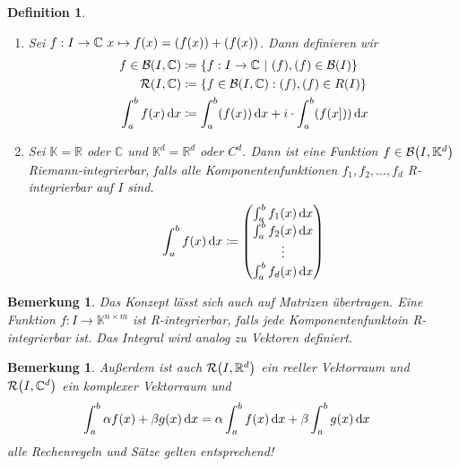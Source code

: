 \documentclass[11pt, twoside, a4paper]{article}
\theoremstyle{plain}
\newtheorem{bemerkung}[blockelement]{Bemerkung}
\newtheorem{definition}[blockelement]{Definition}
\numberwithin{equation}{subsection}
\newcommand{\set}[1]{\left\{#1\right\}}
\newcommand{\of}[1]{\mathopen{}\mathclose{}\bgroup\left(#1\aftergroup\egroup\right)}
\newcommand{\fromto}{\rightarrow{}}
\newcommand{\dif}{\mathop{}\!\mathrm{d}}
\newcommand{\theoremescape}{\leavevmode}
\let\Re\relax
\let\Im\relax
\DeclareMathOperator{\Re}{Re}
\DeclareMathOperator{\Im}{Im}
\newcommand{\R}{\mathbb{R}}
\newcommand{\C}{\mathbb{C}}
\newcommand{\K}{\mathbb{K}}
\newcommand{\mR}{\mathcal{R}}
\newcommand{\mB}{\mathcal{B}}
\begin{document}
    \noindent
    \begin{definition}
        \begin{enumerate}[label=(\alph*)]
            \theoremescape
            \item Sei $f: I\fromto\C~x\mapsto f\of{x} = \Re\of{f\of{x}} + \Im\of{f\of{x}}$. Dann definieren wir
            \begin{align*}
                f\in\mB\of{I, \C} &\coloneqq\set{f: I\fromto\C~\middle|~\Re\of{f}, \Im\of{f} \in \mB\of{I}}\\
                \mR\of{I, \C} &\coloneqq\set{f\in\mB\of{I, \C}: \Re\of{f}, \Im\of{f}\in R\of{I}}\\
                \int_{a}^{b} f\of{x} \dif x &\coloneqq \int_{a}^{b} \Re\of{f\of{x}} \dif x + i\cdot \int_{a}^{b} \Im\of{f\of{x]}} \dif x
            \end{align*}
            \item Sei $\K= \R$ oder $\C$ und $\K^d = \R^d$ oder $C^d$. Dann ist eine Funktion $f\in\mB\of{I, \K^d}$ Riemann-integrierbar, falls alle Komponentenfunktionen $f_1, f_2, \dots, f_d$ R-integrierbar auf $I$ sind.
            \begin{align*}
                \int_{a}^{b} f\of{x} \dif x\coloneqq \begin{pmatrix}
                                                         \int_{a}^{b} f_1\of{x} \dif x \\
                                                         \int_{a}^{b} f_2\of{x} \dif x \\
                                                         \vdots                        \\
                                                         \int_{a}^{b} f_d\of{x} \dif x \\
                \end{pmatrix}
            \end{align*}
        \end{enumerate}
    \end{definition}

    \begin{bemerkung}
        Das Konzept lässt sich auch auf Matrizen übertragen. Eine Funktion $f: I\fromto \K^{n\times m}$ ist R-integrierbar, falls jede Komponentenfunktoin R-integrierbar ist. Das Integral wird analog zu Vektoren definiert.
    \end{bemerkung}

    \begin{bemerkung}
        Außerdem ist auch $\mR\of{I, \R^d}$ ein reeller Vektorraum und $\mR\of{I, \C^d}$ ein komplexer Vektorraum und
        \begin{align*}
            \int_{a}^{b} \alpha f\of{x} + \beta g\of{x} \dif x &= \alpha \int_{a}^{b} f\of{x} \dif x + \beta \int_{a}^{b} g\of{x} \dif x
        \end{align*}
        alle Rechenregeln und Sätze gelten entsprechend!
    \end{bemerkung}
\end{document}
